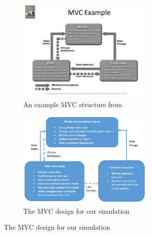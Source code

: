 \documentclass{article}
\begin{document}
	\begin{figure}[p]
		\centering
		\begin{subfigure}{\textwidth}
			\centering
			\includegraphics[width=0.75\textwidth]{MVCExample.jpg}
			\caption{An example MVC structure from \cite{bass2007software}}
		\end{subfigure}	
		\par \bigskip
		\begin{subfigure}{\textwidth}
			\centering
			\includegraphics[width=0.75\textwidth]{mvc}
			\caption{The MVC design for our simulation}
			\label{OurMvc}
		\end{subfigure}
		
		
	\end{figure}
	
\end{document}
